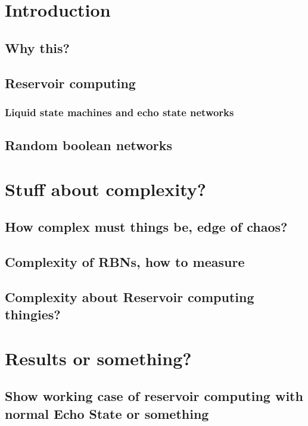 \section{Introduction}

\subsection{Why this?}

\subsection{Reservoir computing}

\subsubsection{Liquid state machines and echo state networks}

\subsection{Random boolean networks}

\section{Stuff about complexity?}

\subsection{How complex must things be, edge of chaos?}

\subsection{Complexity of RBNs, how to measure}

\subsection{Complexity about Reservoir computing thingies?}

\section{Results or something?}

\subsection{Show working case of reservoir computing with normal Echo State or something}

